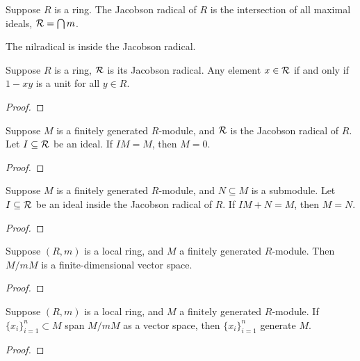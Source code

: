 \begin{definition}
    Suppose \(R\) is a ring.
    The Jacobson radical of \(R\) is the intersection of all maximal ideals,
    \(\mathcal{R} = \bigcap m\).
\end{definition}
\begin{remark}
    The nilradical is inside the Jacobson radical.
\end{remark}
\begin{lemma}
    Suppose \(R\) is a ring, \(\mathcal{R}\) is its Jacobson radical.
    Any element \(x \in \mathcal{R}\) if and only if \(1 - xy\) is a unit for all \(y \in R\).
\end{lemma}
\begin{proof}
    
\end{proof}
\begin{theorem}
    Suppose \(M\) is a finitely generated \(R\)-module,
    and \(\mathcal{R}\) is the Jacobson radical of \(R\).
    Let \(I \subseteq \mathcal{R}\) be an ideal.
    If \(IM = M\), then \(M = 0\).
\end{theorem}
\begin{proof}
    
\end{proof}
\begin{corollary}
    Suppose \(M\) is a finitely generated \(R\)-module,
    and \(N \subseteq M\) is a submodule.
    Let \(I \subseteq \mathcal{R}\) be an ideal inside the Jacobson radical of \(R\).
    If \(IM + N = M\), then \(M = N\).
\end{corollary}
\begin{proof}
    
\end{proof}
\begin{corollary}
    Suppose \((R,m)\) is a local ring,
    and \(M\) a finitely generated \(R\)-module.
    Then \(M/mM\) is a finite-dimensional vector space.
\end{corollary}
\begin{proof}
    
\end{proof}

\begin{theorem}
    Suppose \((R,m)\) is a local ring,
    and \(M\) a finitely generated \(R\)-module.
    If \({\{x_i\}}_{i=1}^n \subset M\) span \(M/mM\) as a vector space,
    then \({\{x_i\}}_{i=1}^n\) generate \(M\).
\end{theorem}
\begin{proof}
    
\end{proof}


